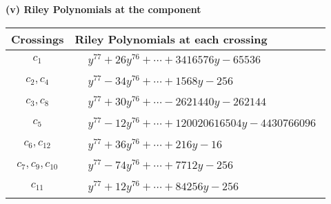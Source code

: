 \documentclass[1p]{elsarticle_modified}
\theoremstyle{definition}
\begin{document}
\flushleft \textbf{(v) Riley Polynomials at the component}\newline \\
\begin{tabular}{m{50pt}|m{274pt}}
Crossings & \hspace{64pt}Riley Polynomials at each crossing \\
\hline $$\begin{aligned}c_{1}\end{aligned}$$&$\begin{aligned}
&y^{77}+26 y^{76}+\cdots+3416576 y-65536
\end{aligned}$\\
\hline $$\begin{aligned}c_{2},c_{4}\end{aligned}$$&$\begin{aligned}
&y^{77}-34 y^{76}+\cdots+1568 y-256
\end{aligned}$\\
\hline $$\begin{aligned}c_{3},c_{8}\end{aligned}$$&$\begin{aligned}
&y^{77}+30 y^{76}+\cdots-2621440 y-262144
\end{aligned}$\\
\hline $$\begin{aligned}c_{5}\end{aligned}$$&$\begin{aligned}
&y^{77}-12 y^{76}+\cdots+120020616504 y-4430766096
\end{aligned}$\\
\hline $$\begin{aligned}c_{6},c_{12}\end{aligned}$$&$\begin{aligned}
&y^{77}+36 y^{76}+\cdots+216 y-16
\end{aligned}$\\
\hline $$\begin{aligned}c_{7},c_{9},c_{10}\end{aligned}$$&$\begin{aligned}
&y^{77}-74 y^{76}+\cdots+7712 y-256
\end{aligned}$\\
\hline $$\begin{aligned}c_{11}\end{aligned}$$&$\begin{aligned}
&y^{77}+12 y^{76}+\cdots+84256 y-256
\end{aligned}$\\
\hline
\end{tabular}\\~\\
\end{document}
